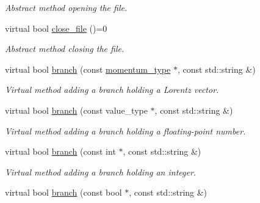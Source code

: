 \begin{DoxyCompactItemize}
\begin{DoxyCompactList}\small\item\em Abstract method opening the file. \end{DoxyCompactList}\item 
\hypertarget{a00315_a25ebf7a86cd5f93b7582aacf6932fcf2}{virtual bool \hyperlink{a00315_a25ebf7a86cd5f93b7582aacf6932fcf2}{close\-\_\-file} ()=0}\label{a00315_a25ebf7a86cd5f93b7582aacf6932fcf2}

\begin{DoxyCompactList}\small\item\em Abstract method closing the file. \end{DoxyCompactList}\item 
\hypertarget{a00315_a2a076e52335cd34901d796b50eb43e95}{virtual bool \hyperlink{a00315_a2a076e52335cd34901d796b50eb43e95}{branch} (const \hyperlink{a00559}{momentum\-\_\-type} $\ast$, const std\-::string \&)}\label{a00315_a2a076e52335cd34901d796b50eb43e95}

\begin{DoxyCompactList}\small\item\em Virtual method adding a branch holding a Lorentz vector. \end{DoxyCompactList}\item 
\hypertarget{a00315_a84acdedce7e9f533520359eea3c5e8ba}{virtual bool \hyperlink{a00315_a84acdedce7e9f533520359eea3c5e8ba}{branch} (const value\-\_\-type $\ast$, const std\-::string \&)}\label{a00315_a84acdedce7e9f533520359eea3c5e8ba}

\begin{DoxyCompactList}\small\item\em Virtual method adding a branch holding a floating-\/point number. \end{DoxyCompactList}\item 
\hypertarget{a00315_ab4d33b8a2d429fa44a9f75c8b202c889}{virtual bool \hyperlink{a00315_ab4d33b8a2d429fa44a9f75c8b202c889}{branch} (const int $\ast$, const std\-::string \&)}\label{a00315_ab4d33b8a2d429fa44a9f75c8b202c889}

\begin{DoxyCompactList}\small\item\em Virtual method adding a branch holding an integer. \end{DoxyCompactList}\item 
\hypertarget{a00315_af1c0d6fc5a8027f99756653914d116c6}{virtual bool \hyperlink{a00315_af1c0d6fc5a8027f99756653914d116c6}{branch} (const bool $\ast$, const std\-::string \&)}\label{a00315_af1c0d6fc5a8027f99756653914d116c6}


\end{DoxyCompactItemize}
